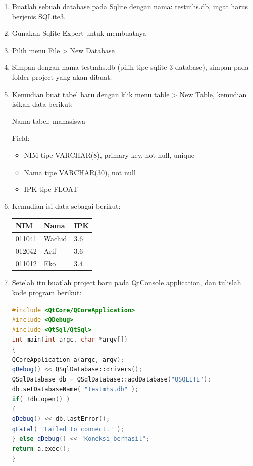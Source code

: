 \begin{enumerate}


\item
Buatlah sebuah database pada Sqlite dengan nama: testmhs.db, ingat
harus berjenis SQLite3.



\item
Gunakan Sqlite Expert untuk membuatnya
\item
Pilih menu File \textgreater{} New Database


\item
Simpan dengan nama testmhs.db (pilih tipe sqlite 3 database), simpan
pada folder project yang akan dibuat.
\item
Kemudian buat tabel baru dengan klik menu table \textgreater{} New Table,
kemudian isikan data berikut:

Nama tabel: mahasiswa

Field:

\begin{itemize}

\item
NIM tipe VARCHAR(8), primary key, not null, unique
\item
Nama tipe VARCHAR(30), not null
\item
IPK tipe FLOAT
\end{itemize}


\item
Kemudian isi data sebagai berikut:


\begin{longtable}[]{@{}lll@{}}
\toprule
NIM & Nama & IPK\tabularnewline
\midrule
\endhead
011041 & Wachid & 3.6\tabularnewline
012042 & Arif & 3.6\tabularnewline
011012 & Eko & 3.4\tabularnewline
\bottomrule
\end{longtable}


\item
Setelah itu buatlah project baru pada QtConsole application, dan
tulislah kode program berikut:

\begin{lstlisting}[language=c++, caption=Percobaan koneksi SQLite dengan QtConsole]
#include <QtCore/QCoreApplication>
#include <QDebug>
#include <QtSql/QtSql>
int main(int argc, char *argv[])
{
QCoreApplication a(argc, argv);
qDebug() << QSqlDatabase::drivers();
QSqlDatabase db = QSqlDatabase::addDatabase("QSQLITE");
db.setDatabaseName( "testmhs.db" );
if( !db.open() )
{
qDebug() << db.lastError();
qFatal( "Failed to connect." );
} else qDebug() << "Koneksi berhasil";
return a.exec();
}
\end{lstlisting}


\end{enumerate}
